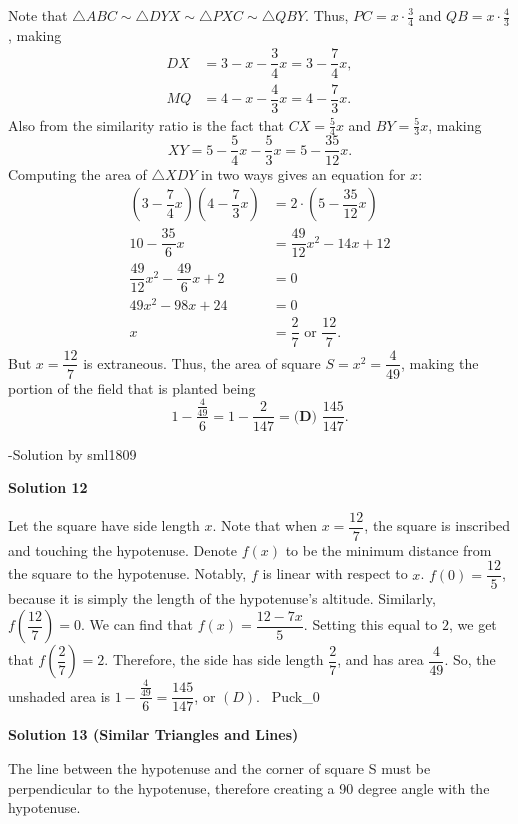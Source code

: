 \begin{enumerate}
 Note that $\triangle ABC \sim \triangle DYX \sim \triangle PXC \sim \triangle QBY$. Thus, $PC = x \cdot \frac34$ and $QB = x \cdot \frac43$, making
 \begin{align*} DX &= 3-x-\dfrac{3}{4}x = 3-\dfrac{7}{4}x, \\ MQ &= 4-x-\dfrac{4}{3}x = 4-\dfrac{7}{3}x. \end{align*}
Also from the similarity ratio is the fact that $CX = \frac54 x$ and $BY = \frac53 x$, making
 \[XY = 5 - \dfrac{5}{4}x - \dfrac{5}{3}x = 5 - \dfrac{35}{12}x.\]Computing the area of $\triangle XDY$ in two ways gives an equation for $x$:
 \begin{align*} \left(3-\dfrac{7}{4}x\right)\left(4-\dfrac{7}{3}x\right) &= 2\cdot \left(5 - \dfrac{35}{12}x\right) \\ 10-\dfrac{35}{6}x &= \dfrac{49}{12}x^2 - 14x + 12 \\ \dfrac{49}{12}x^2 - \dfrac{49}{6}x + 2 &= 0 \\ 49x^2 - 98x + 24 &= 0 \\ x&=\dfrac{2}{7} \text{ or } \dfrac{12}{7}. \end{align*}
But $x=\dfrac{12}{7}$ is extraneous. Thus, the area of square $S = x^2 = \dfrac{4}{49}$, making the portion of the field that is planted being 
 \[1 - \dfrac{\frac{4}{49}}{6} = 1 - \dfrac{2}{147} = \boxed{\textbf{(D) } \frac{145}{147}}.\]

 -Solution by sml1809

 



\textbf{Solution 12}

Let the square have side length $x$. Note that when $x = \dfrac{12}{7}$, the square is inscribed and touching the hypotenuse. Denote $f(x)$ to be the minimum distance from the square to the hypotenuse. Notably, $f$ is linear with respect to $x$. $f(0) = \dfrac{12}{5}$, because it is simply the length of the hypotenuse's altitude. Similarly, $f(\dfrac{12}{7}) = 0$. We can find that $f(x) = \dfrac{12-7x}{5}$. Setting this equal to $2$, we get that $f(\dfrac{2}{7}) = 2$. Therefore, the side has side length $\dfrac27$, and has area $\dfrac{4}{49}$. So, the unshaded area is $1 - \dfrac{\frac{4}{49}}{6} = \boxed{\dfrac{145}{147}}$, or $(D)$. ~Puck\_0

 



\textbf{Solution 13 (Similar Triangles and Lines)}

The line between the hypotenuse and the corner of square S must be perpendicular to the hypotenuse, therefore creating a 90 degree angle with the hypotenuse.


\end{enumerate}
